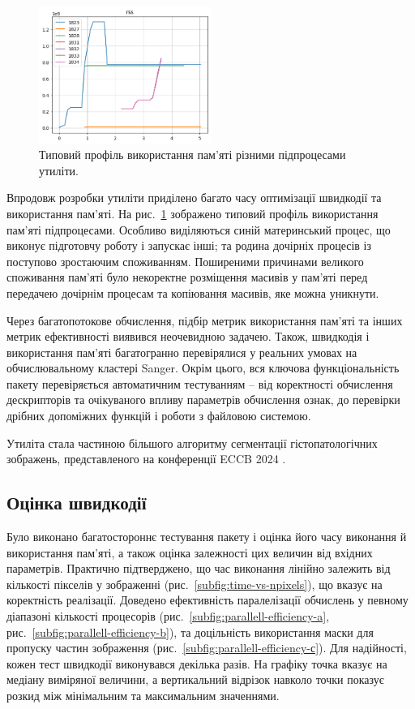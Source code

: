 \begin{figure}[h]
    \centering
    \includegraphics[width=0.5\textwidth]{img/fastlbp/memtest-1-rss.png}
    \caption{
        Типовий профіль використання пам'яті різними підпроцесами утиліти.
    }
    \label{fig:memprofile}
\end{figure}

Впродовж розробки утиліти приділено багато часу оптимізації швидкодії та використання пам'яті. 
На рис.~\ref{fig:memprofile} зображено типовий профіль використання пам'яті підпроцесами.
Особливо виділяються синій материнський процес, що виконує підготовчу роботу і запускає інші; 
та родина дочірніх процесів із поступово зростаючим споживанням.
Поширеними причинами великого споживання пам'яті було некоректне розміщення масивів у пам'яті перед передачею дочірнім процесам 
та копіювання масивів, яке можна уникнути. 

Через багатопотокове обчислення, підбір метрик використання пам'яті та інших метрик ефективності виявився неочевидною задачею.
Також, швидкодія і використання пам'яті багатогранно перевірялися у реальних умовах на обчислювальному кластері Sanger.
Окрім цього, вся ключова функціональність пакету перевіряється автоматичним тестуванням -- від коректності обчислення дескрипторів та очікуваного впливу параметрів обчислення ознак, 
до перевірки дрібних допоміжних функцій і роботи з файловою системою. 

Утиліта стала частиною більшого алгоритму сегментації гістопатологічних зображень, 
представленого на конференції ECCB 2024 \cite{fastlbp2024}.

\subsection{Оцінка швидкодії}\label{section2.2d}\hfill

Було виконано багатостороннє тестування пакету і оцінка його часу виконання й використання пам'яті, 
а також оцінка залежності цих величин від вхідних параметрів.
Практично підтверджено, що час виконання лінійно залежить від кількості пікселів у зображенні (рис.~\ref{subfig:time-vs-npixels}), 
що вказує на коректність реалізації. Доведено ефективність паралелізації обчислень у певному діапазоні кількості процесорів (рис.~\ref{subfig:parallell-efficiency-a}, рис.~\ref{subfig:parallell-efficiency-b}),
та доцільність використання маски для пропуску частин зображення (рис.~\ref{subfig:parallell-efficiency-с}).
Для надійності, кожен тест швидкодії виконувався декілька разів. На графіку точка вказує на медіану виміряної величини, 
а вертикальний відрізок навколо точки показує розкид між мінімальним та максимальним значеннями.

